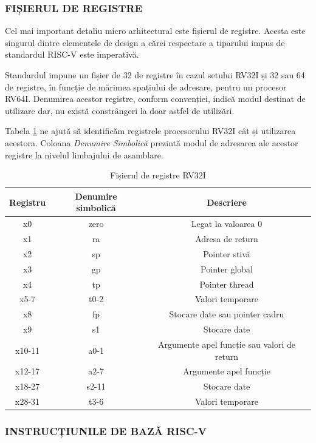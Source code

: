 \documentclass[12pt]{article}
\begin{document}
\subsubsection{FIȘIERUL DE REGISTRE}
  Cel mai important detaliu micro arhitectural este fișierul de registre. Acesta este singurul dintre elementele de design a cărei respectare a tiparului impus de standardul RISC-V este imperativă.
  
   Standardul impune un fișier de 32 de registre în cazul setului RV32I și 32 sau 64 de registre, în funcție de mărimea spațiului de adresare, pentru un procesor RV64I. Denumirea acestor registre, conform convenției, indică modul destinat de utilizare dar, nu există constrângeri la doar astfel de utilizări.
   
Tabela \ref{Tabela:12} ne ajută să identificăm registrele procesorului RV32I cât și utilizarea acestora. Coloana \textit{Denumire Simbolică} prezintă modul de adresarea ale acestor registre la nivelul limbajului de asamblare.

\begin{table}[h]
\centering
\caption{Fișierul de registre RV32I}
\label{Tabela:12}
\begin{tabular}{ ||c|c|c|| }
 \hline
 Registru & Denumire simbolică & Descriere\\ 
 \hline  \hline
 x0 & zero & Legat la valoarea 0 \\
 \hline
 x1 & ra & Adresa de return \\
 \hline
 x2 & sp & Pointer stivă \\
 \hline 
 x3 & gp & Pointer global \\
  \hline
 x4 & tp & Pointer thread \\
  \hline  
 x5-7 & t0-2 & Valori temporare \\
 \hline
 x8 & fp & Stocare date sau pointer cadru \\
  \hline  
 x9 & s1 & Stocare date \\
  \hline  
 x10-11 & a0-1 & Argumente apel funcție sau valori de return \\
  \hline  
 x12-17 & a2-7 & Argumente apel funcție \\
  \hline  
 x18-27 & s2-11 & Stocare date \\
  \hline  
 x28-31 & t3-6 & Valori temporare \\
  \hline  
\end{tabular}
\end{table}

\subsubsection{INSTRUCȚIUNILE DE BAZĂ RISC-V}
\end{document}
